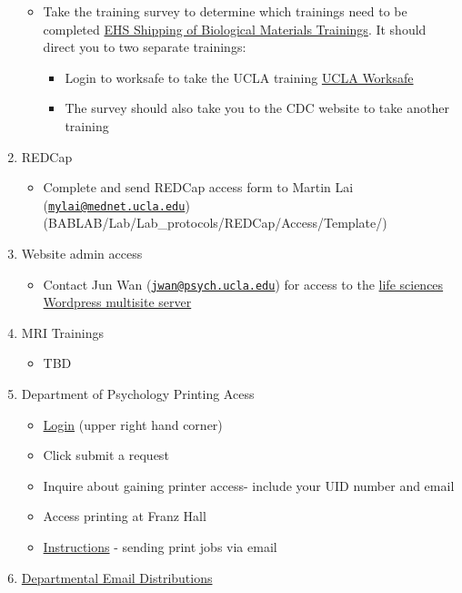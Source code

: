 \documentclass[
]{book}
\providecommand{\tightlist}{%
  \setlength{\itemsep}{0pt}\setlength{\parskip}{0pt}}
\begin{document}
\begin{enumerate}
  \begin{itemize}
  \tightlist
  \item
    Take the training survey to determine which trainings need to be completed \href{https://www.ehs.ucla.edu/training-support/courses/biosafety/bioshipping}{EHS Shipping of Biological Materials Trainings}. It should direct you to two separate trainings:

    \begin{itemize}
    \tightlist
    \item
      Login to worksafe to take the UCLA training \href{https://worksafe.ucla.edu/ucla/Programs/Standard/Control/elmLearner.wml}{UCLA Worksafe}
    \item
      The survey should also take you to the CDC website to take another training
    \end{itemize}
  \end{itemize}
\item
  REDCap

  \begin{itemize}
  \tightlist
  \item
    Complete and send REDCap access form to Martin Lai (\href{mailto:mylai@mednet.ucla.edu}{\nolinkurl{mylai@mednet.ucla.edu}}) (BABLAB/Lab/Lab\_protocols/REDCap/Access/Template/)
  \end{itemize}
\item
  Website admin access

  \begin{itemize}
  \tightlist
  \item
    Contact Jun Wan (\href{mailto:jwan@psych.ucla.edu}{\nolinkurl{jwan@psych.ucla.edu}}) for access to the \href{https://sites.lifesci.ucla.edu/}{life sciences Wordpress multisite server}
  \end{itemize}
\item
  MRI Trainings

  \begin{itemize}
  \tightlist
  \item
    TBD
  \end{itemize}
\item
  Department of Psychology Printing Acess

  \begin{itemize}
  \tightlist
  \item
    \href{https://support.lifesci.ucla.edu/hc/en-us}{Login} (upper right hand corner)
  \item
    Click submit a request
  \item
    Inquire about gaining printer access- include your UID number and email
  \item
    Access printing at Franz Hall
  \item
    \href{https://ucla.app.box.com/s/db0zzvgrydw1yz99yo1nlooq1j4n7jos}{Instructions} - sending print jobs via email
  \end{itemize}
\item
  \href{https://ucla.app.box.com/v/Psych-Directory-List}{Departmental Email Distributions}
\end{enumerate}
\end{document}
